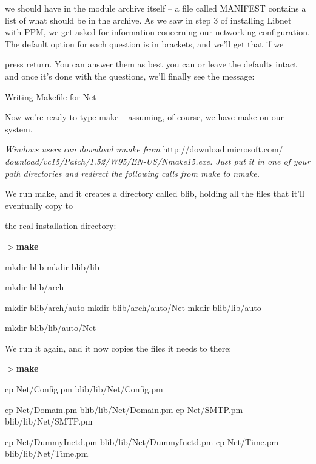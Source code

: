 \documentclass[a4paper,11pt]{book}
\begin{document}
\noindent we should have in the module archive itself -- a file called MANIFEST contains a list of what should be in the archive. As we saw in step 3 of installing Libnet with PPM, we get asked for information concerning our networking configuration. The default option for each question is in brackets, and we'll get that if we

\noindent press return. You can answer them as best you can or leave the defaults intact and once it's done with the questions, we'll finally see the message:

\noindent 

\noindent Writing Makefile for Net

\noindent 

\noindent Now we're ready to type make -- assuming, of course, we have make on our system.

\noindent 

\noindent \textit{Windows users can download nmake from }http://download.microsoft.com/\textit{ download/vc15/Patch/1.52/W95/EN-US/Nmake15.exe. Just put it in one of your path directories and redirect the following calls from make to nmake.}

\noindent 

\noindent 

\noindent We run make, and it creates a directory called blib, holding all the files that it'll eventually copy to

\noindent the real installation directory:

\noindent 

\noindent $>$\textbf{make}

\noindent mkdir blib mkdir blib/lib

\noindent mkdir blib/arch

\noindent mkdir blib/arch/auto mkdir blib/arch/auto/Net mkdir blib/lib/auto

\noindent mkdir blib/lib/auto/Net

\noindent 

\noindent We run it again, and it now copies the files it needs to there:

\noindent 

\noindent $>$\textbf{make}

\noindent cp Net/Config.pm blib/lib/Net/Config.pm

\noindent cp Net/Domain.pm blib/lib/Net/Domain.pm cp Net/SMTP.pm blib/lib/Net/SMTP.pm

\noindent cp Net/DummyInetd.pm blib/lib/Net/DummyInetd.pm cp Net/Time.pm blib/lib/Net/Time.pm
\end{document}
